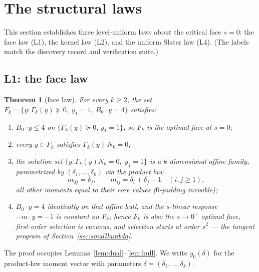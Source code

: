 \documentclass[11pt]{article}
\newtheorem{theorem}{Theorem}[section]
\begin{document}
\section{The structural laws}\label{sec:laws}

This section establishes three level-uniform laws about the critical face
$s=0$: the face law (L1), the kernel law (L2), and the uniform Slater law
(L4). (The labels match the discovery record and verification suite.)

\subsection{L1: the face law}

\begin{theorem}[face law]\label{thm:L1}
For every $k\ge2$, the set
$F_k=\{y:\Gamma_k(y)\succeq0,\;y_1=1,\;B_0\cdot y=4\}$ satisfies:
\begin{enumerate}
\item $B_0\cdot y\le4$ on $\{\Gamma_k(y)\succeq0,\,y_1=1\}$, so $F_k$ is
  the optimal face at $s=0$;
\item every $y\in F_k$ satisfies $\Gamma_k(y)\,N_k=0$;
\item the solution set $\{y:\Gamma_k(y)N_k=0,\;y_1=1\}$ is a
  $k$-dimensional affine family, parametrized by
  $(\delta_1,\dots,\delta_k)$ via the \emph{product law}
  \[
  m_{0j}=\delta_j,\qquad m_{ij}=\delta_i+\delta_j-1\quad(i,j\ge1),
  \]
  all other moments equal to their core values ($0$-padding invisible);
\item $B_0\cdot y=4$ identically on that affine hull, and the $s$-linear
  response $-m\cdot y=-1$ is constant on $F_k$; hence $F_k$ is also the
  $s\to0^+$ optimal face, first-order selection is vacuous, and selection
  starts at order $s^2$ --- the tangent program of
  Section~\ref{sec:smalllambda}.
\end{enumerate}
\end{theorem}

The proof occupies Lemmas~\ref{lem:dual}--\ref{lem:hull}. We write
$y_0(\delta)$ for the product-law moment vector with parameters
$\delta=(\delta_1,\dots,\delta_k)$.
\end{document}
